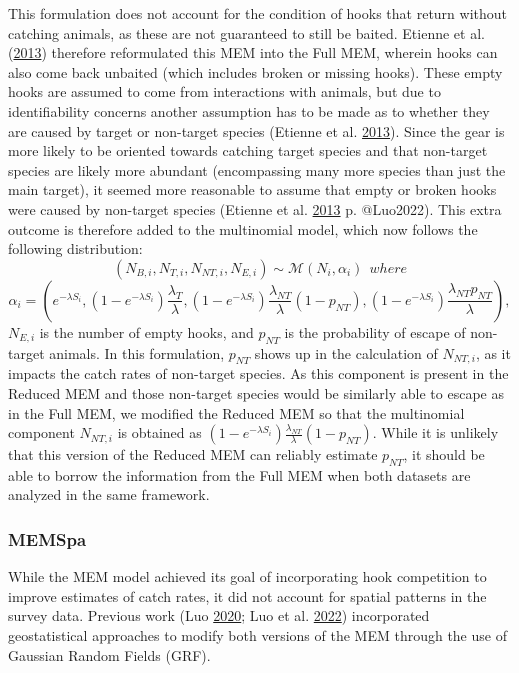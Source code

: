 \documentclass[12pt]{article}\usepackage[]{graphicx}\usepackage[]{color}
\begin{document}
This formulation does not account for the condition of hooks that return without catching animals, as these are not guaranteed to still be baited. Etienne et al. (\protect\hyperlink{ref-Etienne2013}{2013}) therefore reformulated this MEM into the Full MEM, wherein hooks can also come back unbaited (which includes broken or missing hooks). These empty hooks are assumed to come from interactions with animals, but due to identifiability concerns another assumption has to be made as to whether they are caused by target or non-target species (Etienne et al. \protect\hyperlink{ref-Etienne2013}{2013}). Since the gear is more likely to be oriented towards catching target species and that non-target species are likely more abundant (encompassing many more species than just the main target), it seemed more reasonable to assume that empty or broken hooks were caused by non-target species (Etienne et al. \protect\hyperlink{ref-Etienne2013}{2013} p. @Luo2022). This extra outcome is therefore added to the multinomial model, which now follows the following distribution:
\begin{equation}
(N_{B,i},N_{T,i},N_{NT,i},N_{E,i}) \sim \mathcal{M}(N_i,\alpha_i) \ \ where
\end{equation} \begin{equation}
\alpha_i = (e^{-\lambda S_i},(1-e^{-\lambda S_i})\frac{\lambda_T}{\lambda},(1-e^{-\lambda S_i})\frac{\lambda_{NT}}{\lambda}(1-p_{NT}),(1-e^{-\lambda S_i})\frac{\lambda_{NT}p_{NT}}{\lambda}),
\end{equation}
\(N_{E,i}\) is the number of empty hooks, and \(p_{NT}\) is the probability of escape of non-target animals. In this formulation, \(p_{NT}\) shows up in the calculation of \(N_{NT,i}\), as it impacts the catch rates of non-target species. As this component is present in the Reduced MEM and those non-target species would be similarly able to escape as in the Full MEM, we modified the Reduced MEM so that the multinomial component \(N_{NT,i}\) is obtained as \((1-e^{-\lambda S_i})\frac{\lambda_{NT}}{\lambda}(1-p_{NT})\). While it is unlikely that this version of the Reduced MEM can reliably estimate \(p_{NT}\), it should be able to borrow the information from the Full MEM when both datasets are analyzed in the same framework.

\hypertarget{memspa}{%
\subsubsection{MEMSpa}\label{memspa}}

While the MEM model achieved its goal of incorporating hook competition to improve estimates of catch rates, it did not account for spatial patterns in the survey data. Previous work (Luo \protect\hyperlink{ref-Luo2020}{2020}; Luo et al. \protect\hyperlink{ref-Luo2022}{2022}) incorporated geostatistical approaches to modify both versions of the MEM through the use of Gaussian Random Fields (GRF).
\end{document}
